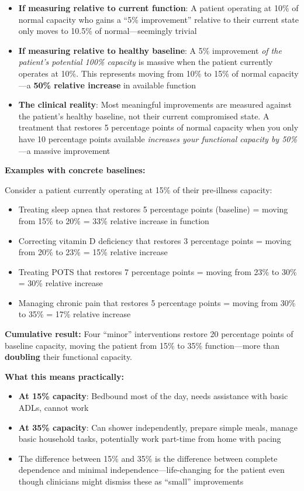 \begin{itemize}
    \item \textbf{If measuring relative to current function}: A patient operating at 10\% of normal capacity who gains a ``5\% improvement'' relative to their current state only moves to 10.5\% of normal---seemingly trivial

    \item \textbf{If measuring relative to healthy baseline}: A 5\% improvement \textit{of the patient's potential 100\% capacity} is massive when the patient currently operates at 10\%. This represents moving from 10\% to 15\% of normal capacity---a \textbf{50\% relative increase} in available function

    \item \textbf{The clinical reality}: Most meaningful improvements are measured against the patient's healthy baseline, not their current compromised state. A treatment that restores 5 percentage points of normal capacity when you only have 10 percentage points available \textit{increases your functional capacity by 50\%}---a massive improvement
\end{itemize}

\textbf{Examples with concrete baselines:}

Consider a patient currently operating at 15\% of their pre-illness capacity:

\begin{itemize}
    \item Treating sleep apnea that restores 5 percentage points (baseline) = moving from 15\% to 20\% = 33\% relative increase in function
    \item Correcting vitamin D deficiency that restores 3 percentage points = moving from 20\% to 23\% = 15\% relative increase
    \item Treating POTS that restores 7 percentage points = moving from 23\% to 30\% = 30\% relative increase
    \item Managing chronic pain that restores 5 percentage points = moving from 30\% to 35\% = 17\% relative increase
\end{itemize}

\textbf{Cumulative result:} Four ``minor'' interventions restore 20 percentage points of baseline capacity, moving the patient from 15\% to 35\% function---more than \textbf{doubling} their functional capacity.

\textbf{What this means practically:}

\begin{itemize}
    \item \textbf{At 15\% capacity}: Bedbound most of the day, needs assistance with basic ADLs, cannot work
    \item \textbf{At 35\% capacity}: Can shower independently, prepare simple meals, manage basic household tasks, potentially work part-time from home with pacing

    \item The difference between 15\% and 35\% is the difference between complete dependence and minimal independence---life-changing for the patient even though clinicians might dismiss these as ``small'' improvements
\end{itemize}

